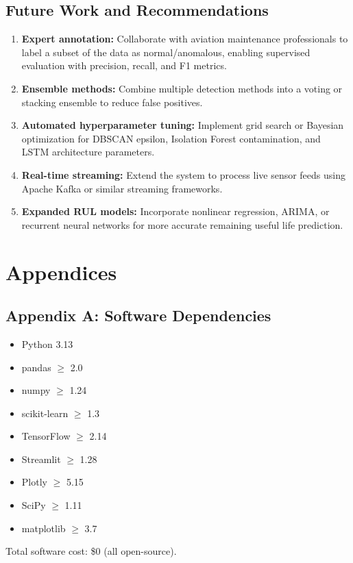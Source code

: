 \documentclass{CLS_zhou430}
\begin{document}
\section{Future Work and Recommendations}
\begin{enumerate}
    \item \textbf{Expert annotation:} Collaborate with aviation maintenance professionals to label a subset of the data as normal/anomalous, enabling supervised evaluation with precision, recall, and F1 metrics.
    \item \textbf{Ensemble methods:} Combine multiple detection methods into a voting or stacking ensemble to reduce false positives.
    \item \textbf{Automated hyperparameter tuning:} Implement grid search or Bayesian optimization for DBSCAN epsilon, Isolation Forest contamination, and LSTM architecture parameters.
    \item \textbf{Real-time streaming:} Extend the system to process live sensor feeds using Apache Kafka or similar streaming frameworks.
    \item \textbf{Expanded RUL models:} Incorporate nonlinear regression, ARIMA, or recurrent neural networks for more accurate remaining useful life prediction.
\end{enumerate}








\chapter*{Appendices}
\appendix

\section{Appendix A: Software Dependencies}
\begin{itemize}
\item Python 3.13
\item pandas $\geq$ 2.0
\item numpy $\geq$ 1.24
\item scikit-learn $\geq$ 1.3
\item TensorFlow $\geq$ 2.14
\item Streamlit $\geq$ 1.28
\item Plotly $\geq$ 5.15
\item SciPy $\geq$ 1.11
\item matplotlib $\geq$ 3.7
\end{itemize}
Total software cost: \$0 (all open-source).
\end{document}
